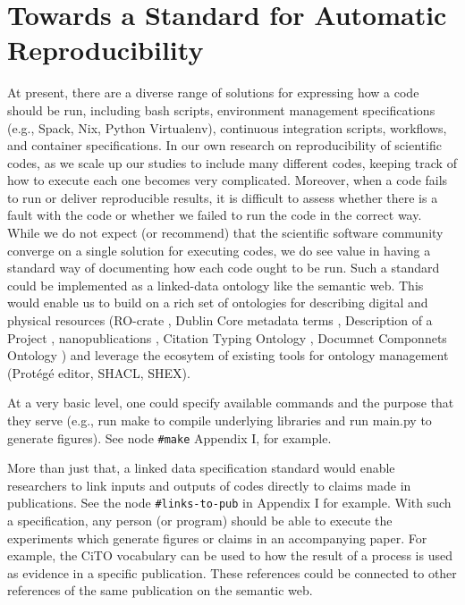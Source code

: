 \documentclass[manuscript,authordraft]{acmart}
\begin{document}
\hypertarget{towards-a-standard-for-automatic-reproducibility}{%
\section{Towards a Standard for Automatic
Reproducibility}\label{towards-a-standard-for-automatic-reproducibility}}

At present, there are a diverse range of solutions for expressing how a
code should be run, including bash scripts, environment management
specifications (e.g., Spack, Nix, Python Virtualenv), continuous
integration scripts, workflows, and container specifications. In our own
research on reproducibility of scientific codes, as we scale up our
studies to include many different codes, keeping track of how to execute
each one becomes very complicated. Moreover, when a code fails to run or
deliver reproducible results, it is difficult to assess whether there is
a fault with the code or whether we failed to run the code in the
correct way. While we do not expect (or recommend) that the scientific
software community converge on a single solution for executing codes, we
do see value in having a standard way of documenting how each code ought
to be run. Such a standard could be implemented as a linked-data
ontology like the semantic web. This would enable us to build on a rich
set of ontologies for describing digital and physical resources
(RO-crate \cite{soiland-reyes_packaging_2022}, Dublin Core metadata
terms \cite{weibel_dublin_2000}, Description of a Project
\cite{wilder-james_description_2017}, nanopublications
\cite{groth_anatomy_2010}, Citation Typing Ontology
\cite{shotton_cito_2010}, Documnet Componnets Ontology
\cite{constantin_document_2016}) and leverage the ecosytem of existing
tools for ontology management (Protégé editor, SHACL, SHEX).

At a very basic level, one could specify available commands and the
purpose that they serve (e.g., run make to compile underlying libraries
and run main.py to generate figures). See node \texttt{\#make} Appendix
I, for example.

More than just that, a linked data specification standard would enable
researchers to link inputs and outputs of codes directly to claims made
in publications. See the node \texttt{\#links-to-pub} in Appendix I for
example. With such a specification, any person (or program) should be
able to execute the experiments which generate figures or claims in an
accompanying paper. For example, the CiTO vocabulary
\cite{shotton_cito_2010} can be used to how the result of a process is
used as evidence in a specific publication. These references could be
connected to other references of the same publication on the semantic
web.
\end{document}
